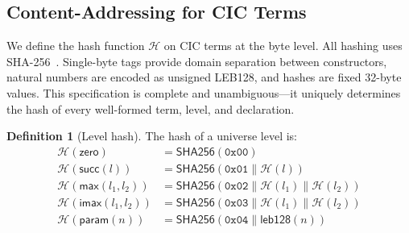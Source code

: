 \documentclass[11pt]{article}
\theoremstyle{definition}
\newtheorem{definition}{Definition}[section]
\theoremstyle{plain}
\theoremstyle{remark}
\newcommand{\hash}{\mathcal{H}}
\newcommand{\SHA}{\textsf{SHA256}}
\newcommand{\concat}{\mathbin{\|}}
\begin{document}
\subsection{Content-Addressing for CIC Terms}
\label{sec:hashing}

We define the hash function $\hash$ on CIC terms at the byte level.
All hashing uses SHA-256~\cite{sha256}.
Single-byte tags provide domain separation between constructors, natural numbers are
encoded as unsigned LEB128, and hashes are fixed 32-byte values.
This specification is complete and unambiguous---it uniquely determines the hash of
every well-formed term, level, and declaration.

\begin{definition}[Level hash]
\label{def:hash-level}
The hash of a universe level is:
\begin{align*}
  \hash(\textsf{zero}) &= \SHA(\mathtt{0x00}) \\
  \hash(\textsf{succ}(l)) &= \SHA(\mathtt{0x01} \concat \hash(l)) \\
  \hash(\textsf{max}(l_1, l_2)) &= \SHA(\mathtt{0x02} \concat \hash(l_1) \concat \hash(l_2)) \\
  \hash(\textsf{imax}(l_1, l_2)) &= \SHA(\mathtt{0x03} \concat \hash(l_1) \concat \hash(l_2)) \\
  \hash(\textsf{param}(n)) &= \SHA(\mathtt{0x04} \concat \textsf{leb128}(n))
\end{align*}
\end{definition}
\end{document}
